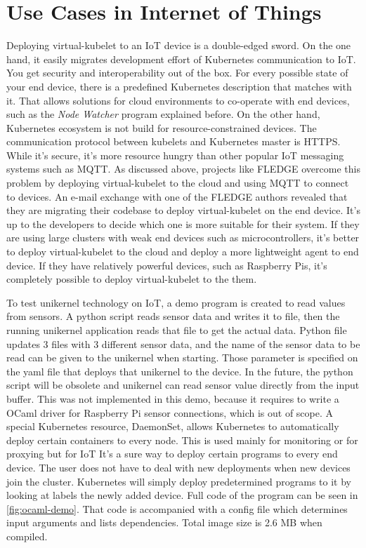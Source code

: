 \section{Use Cases in Internet of Things}

Deploying virtual-kubelet to an IoT device is a double-edged sword. On the one hand, it easily migrates development effort of Kubernetes communication to IoT. You get security and interoperability out of the box. For every possible state of your end device, there is a predefined Kubernetes description that matches with it. That allows solutions for cloud environments to co-operate with end devices, such as the \textit{Node Watcher} program explained before. On the other hand, Kubernetes ecosystem is not build for resource-constrained devices. The communication protocol between kubelets and Kubernetes master is HTTPS. While it's secure, it's more resource hungry than other popular IoT messaging systems such as MQTT. As discussed above, projects like FLEDGE overcome this problem by deploying virtual-kubelet to the cloud and using MQTT to connect to devices. An e-mail exchange with one of the FLEDGE authors revealed that they are migrating their codebase to deploy virtual-kubelet on the end device. It's up to the developers to decide which one is more suitable for their system. If they are using large clusters with weak end devices such as microcontrollers, it's better to deploy virtual-kubelet to the cloud and deploy a more lightweight agent to end device. If they have relatively powerful devices, such as Raspberry Pis, it's completely possible to deploy virtual-kubelet to the them.

To test unikernel technology on IoT, a demo program is created to read values from sensors. A python script reads sensor data and writes it to file, then the running unikernel application reads that file to get the actual data. Python file updates 3 files with 3 different sensor data, and the name of the sensor data to be read can be given to the unikernel when starting. Those parameter is specified on the yaml file that deploys that unikernel to the device. In the future, the python script will be obsolete and unikernel can read sensor value directly from the input buffer. This was not implemented in this demo, because it requires to write a OCaml driver for Raspberry Pi sensor connections, which is out of scope. A special Kubernetes resource, DaemonSet, allows Kubernetes to automatically deploy certain containers to every node. This is used mainly for monitoring or for proxying but for IoT It's a sure way to deploy certain programs to every end device. The user does not have to deal with new deployments when new devices join the cluster. Kubernetes will simply deploy predetermined programs to it by looking at labels the newly added device. Full code of the program can be seen in \ref{fig:ocaml-demo}. That code is accompanied with a config file which determines input arguments and lists dependencies. Total image size is 2.6 MB when compiled.

